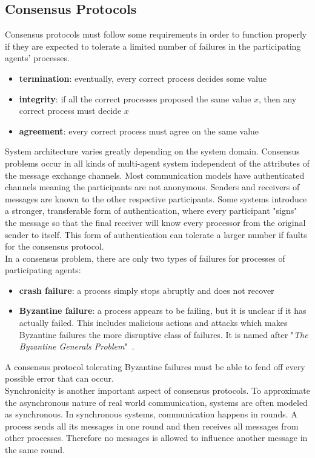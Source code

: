 \subsection{Consensus Protocols}
Consensus protocols must follow some requirements in order to function properly if they are expected to tolerate a limited number of failures in the participating agents' processes.
\begin{itemize}
	\item \textbf{termination}: eventually, every correct process decides some value
	\item \textbf{integrity}: if all the correct processes proposed the same value $x$, then any correct process must decide $x$
	\item \textbf{agreement}: every correct process must agree on the same value
\end{itemize}
System architecture varies greatly depending on the system domain. Consensus problems occur in all kinds of multi-agent system independent of the attributes of the message exchange channels. Most communication models have authenticated channels meaning the participants are not anonymous. Senders and receivers of messages are known to the other respective participants. Some systems introduce a stronger, transferable form of authentication, where every participant "signs" the message so that the final receiver will know every processor from the original sender to itself. This form of authentication can tolerate a larger number if faults for the consensus protocol.~\cite{Coulouris2001}\\
In a consensus problem, there are only two types of failures for processes of participating agents:
\begin{itemize}
	\item \textbf{crash failure}: a process simply stops abruptly and does not recover
	\item \textbf{Byzantine failure}: a process appears to be failing, but it is unclear if it has actually failed. This includes malicious actions and attacks which makes Byzantine failures the more disruptive class of failures. It is named after "\textit{The Byzantine Generals Problem}"~\cite{Lamport1982}.
\end{itemize}
A consensus protocol tolerating Byzantine failures must be able to fend off every possible error that can occur.~\cite{Coulouris2001}\\
Synchronicity is another important aspect of consensus protocols. To approximate the asynchronous nature of real world communication, systems are often modeled as synchronous. In synchronous systems, communication happens in rounds. A process sends all its messages in one round and then receives all messages from other processes. Therefore no messages is allowed to influence another message in the same round.~\cite{Coulouris2001}\\

